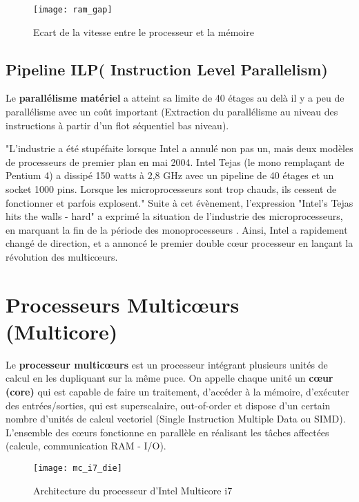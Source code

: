 \begin{figure}[h]
\texttt{[image: ram\_gap]}
\centering
\caption{Ecart de la vitesse entre le processeur et la mémoire \cite{memw04}}
\label{fig:FG_2_2}
\end{figure}
%
\subsection{Pipeline ILP( Instruction Level Parallelism)}
%
Le \textbf{parallélisme matériel} a atteint sa limite de 40 étages au delà il y a peu de parallélisme avec un coût important (Extraction du parallélisme au niveau des instructions à partir d’un flot séquentiel bas niveau). 

"L'industrie a été stupéfaite lorsque Intel a annulé non pas un, mais deux modèles de processeurs de premier plan en mai 2004. Intel Tejas (le mono remplaçant de Pentium 4) a dissipé 150 watts à 2,8 GHz avec un pipeline de 40 étages et un socket 1000 pins. Lorsque les microprocesseurs sont trop chauds, ils cessent de fonctionner et parfois explosent." Suite à cet évènement, l'expression "Intel's Tejas hits the walls - hard" a exprimé la situation de l'industrie des microprocesseurs, en marquant la fin de la période des monoprocesseurs .
Ainsi, Intel a rapidement changé de direction, et a annoncé le premier double cœur processeur en lançant la révolution des multicœurs. \cite{russ11}
\section{Processeurs Multicœurs (Multicore)}
%
Le \textbf{processeur multicœurs} est un processeur intégrant plusieurs unités de calcul en les dupliquant sur la même puce. 
On appelle chaque unité un \textbf{cœur (core)} qui est capable de faire un traitement, d'accéder à la mémoire, d'exécuter des entrées/sorties, qui est superscalaire, out-of-order et dispose d’un certain nombre d’unités de calcul vectoriel (Single Instruction Multiple Data ou SIMD). 
L'ensemble des cœurs fonctionne en parallèle en réalisant les tâches affectées (calcule, communication RAM - I/O).

\begin{figure}[h]
\texttt{[image: mc\_i7\_die]}
\centering
\caption{Architecture du processeur d'Intel Multicore i7 \cite{qaca17}}
\label{fig:FG_2_3}
\end{figure}

